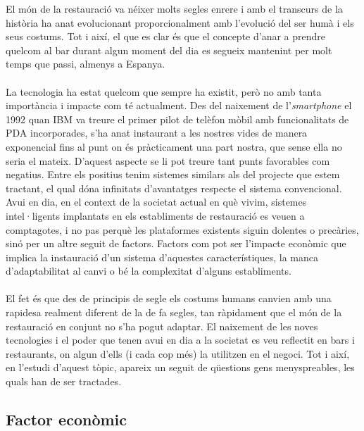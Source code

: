 El món de la restauració va néixer molts segles enrere i amb el transcurs de la història ha anat evolucionant proporcionalment amb l'evolució del ser humà i els seus costums. Tot i així, el que es clar és que el concepte d'anar a prendre quelcom al bar durant algun moment del dia es segueix mantenint per molt temps que passi, almenys a Espanya.
\\\\
La tecnologia ha estat quelcom que sempre ha existit, però no amb tanta importància i impacte com té actualment. Des del naixement de l'\textit{smartphone} \cite{smartphone} el 1992 quan IBM va treure el primer pilot de telèfon mòbil amb funcionalitats de PDA incorporades, s'ha anat instaurant a les nostres vides de manera exponencial fins al punt on és pràcticament una part nostra, que sense ella no seria el mateix. D'aquest aspecte se li pot treure tant punts favorables com negatius. Entre els positius tenim sistemes similars als del projecte que estem tractant, el qual dóna infinitats d'avantatges respecte el sistema convencional. Avui en dia, en el context de la societat actual en què vivim, sistemes intel·ligents implantats en els establiments de restauració es veuen a comptagotes, i no pas perquè les plataformes existents siguin dolentes o precàries, sinó per un altre seguit de factors. Factors com pot ser l'impacte econòmic que implica la instauració d'un sistema d'aquestes característiques, la manca d'adaptabilitat al canvi o bé la complexitat d'alguns establiments.
\\\\
El fet és que des de principis de segle els costums humans canvien amb una rapidesa realment diferent de la de fa segles, tan ràpidament que el món de la restauració en conjunt no s'ha pogut adaptar.
El naixement de les noves tecnologies i el poder que tenen avui en dia a la societat es veu reflectit en bars i restaurants, on algun d'ells (i cada cop més) la utilitzen en el negoci.
Tot i així, en l'estudi d'aquest tòpic, apareix un seguit de qüestions gens menyspreables, les quals han de ser tractades.

\subsection{Factor econòmic}


